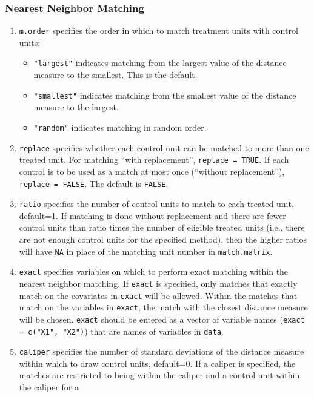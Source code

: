 \documentclass[oneside,letterpaper,titlepage]{article}
\begin{document}
\subsubsection{Nearest Neighbor Matching}
\label{subsubsec:nninputs}
\begin{enumerate}
\item \texttt{m.order}  specifies the order in which to match
  treatment units with control units:
  \begin{itemize}
  \item {\tt "largest"} indicates matching from the largest value of
    the distance measure to the smallest. This is the default.
  \item {\tt "smallest"} indicates matching from the smallest value of
    the distance measure to the largest.
  \item {\tt "random"} indicates matching in random order.
  \end{itemize}
\item \texttt{replace} specifies whether each control unit can be
  matched to more than one treated unit.  For matching ``with
  replacement'', \texttt{replace = TRUE}.  If each control is to be
  used as a match at most once (``without replacement''), \texttt{replace
    = FALSE}. The default is {\tt FALSE}.
\item \texttt{ratio} specifies the number of control units to match to
  each treated unit, default=1.  If matching is done without
  replacement and there are fewer control units than ratio times the
  number of eligible treated units (i.e., there are not enough control 
  units for the specified method), then the higher ratios will have
  \texttt{NA} in place of the matching unit number in
  \texttt{match.matrix}.
\item \texttt{exact} specifies variables on which to perform exact
  matching within the nearest neighbor matching.  If \texttt{exact} is
  specified, only matches that exactly match on the covariates in
  \texttt{exact} will be allowed.  Within the matches that match on
  the variables in \texttt{exact}, the match with the closest distance
  measure will be chosen.  \texttt{exact} should be entered as a
  vector of variable names (\texttt{exact = c("X1", "X2")}) that are
  names of variables in \texttt{data}.
\item \texttt{caliper} specifies the number of standard deviations of
  the distance measure within which to draw control units, default=0.
  If a caliper is specified, the matches are restricted to being
  within the caliper and a control unit within the caliper for a

\end{enumerate}
\end{document}
